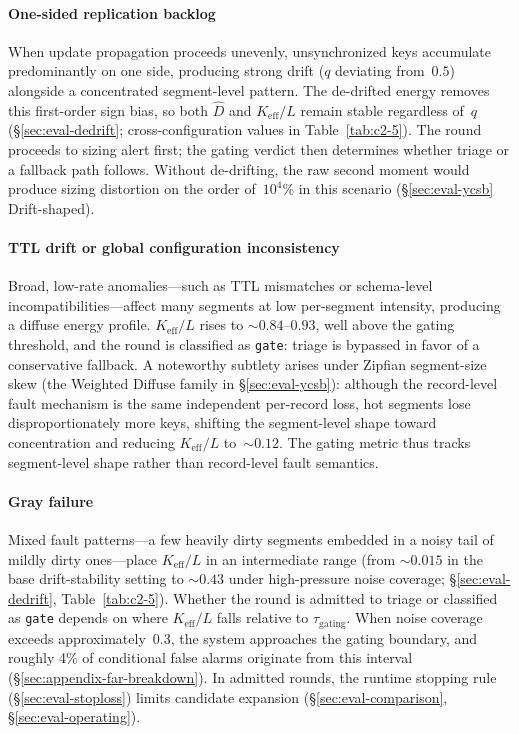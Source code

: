 \paragraph{One-sided replication backlog}
When update propagation proceeds unevenly, unsynchronized keys
accumulate predominantly on one side, producing strong drift
($q$ deviating from~$0.5$) alongside a concentrated
segment-level pattern.  The de-drifted energy removes this
first-order sign bias, so both $\hat{D}$ and
$K_{\text{eff}}/L$ remain stable regardless of~$q$
(\S\ref{sec:eval-dedrift}; cross-configuration values in
Table~\ref{tab:c2-5}).  The round proceeds to sizing alert
first; the gating verdict then determines whether triage or a
fallback path follows.  Without de-drifting, the raw second
moment would produce sizing distortion on the order
of~$10^4\%$ in this scenario
(\S\ref{sec:eval-ycsb} Drift-shaped).

\paragraph{TTL drift or global configuration inconsistency}
Broad, low-rate anomalies---such as TTL mismatches or
schema-level incompatibilities---affect many segments at low
per-segment intensity, producing a diffuse energy profile.
$K_{\text{eff}}/L$ rises to ${\sim}0.84$--$0.93$, well above
the gating threshold, and the round is classified as
\texttt{gate}: triage is bypassed in favor of a conservative
fallback.  A noteworthy subtlety arises under Zipfian
segment-size skew (the Weighted Diffuse family in
\S\ref{sec:eval-ycsb}): although the record-level fault
mechanism is the same independent per-record loss, hot segments
lose disproportionately more keys, shifting the segment-level
shape toward concentration and reducing $K_{\text{eff}}/L$
to~${\sim}0.12$.  The gating metric thus tracks segment-level
shape rather than record-level fault semantics.

\paragraph{Gray failure}
Mixed fault patterns---a few heavily dirty segments embedded
in a noisy tail of mildly dirty ones---place
$K_{\text{eff}}/L$ in an intermediate range (from
${\sim}0.015$ in the base drift-stability setting to
${\sim}0.43$ under high-pressure noise coverage;
\S\ref{sec:eval-dedrift}, Table~\ref{tab:c2-5}).  Whether the
round is admitted to triage or classified as \texttt{gate}
depends on where $K_{\text{eff}}/L$ falls relative to
$\tau_{\text{gating}}$.  When noise coverage exceeds
approximately~0.3, the system approaches the gating boundary,
and roughly 4\% of conditional false alarms originate from
this interval (\S\ref{sec:appendix-far-breakdown}).  In
admitted rounds, the runtime stopping rule
(\S\ref{sec:eval-stoploss}) limits candidate expansion
(\S\ref{sec:eval-comparison}, \S\ref{sec:eval-operating}).

